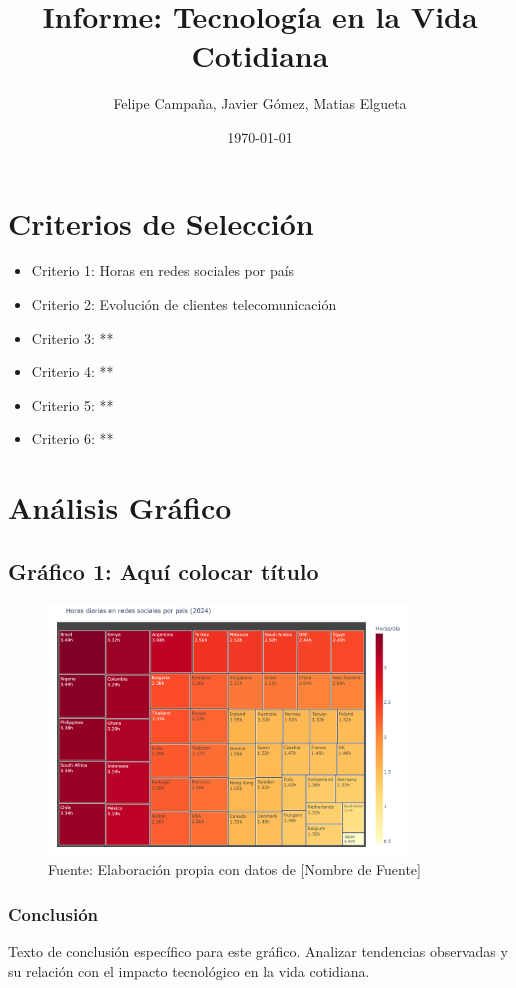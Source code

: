 \documentclass[12pt, a4paper]{article}
\title{Informe: Tecnología en la Vida Cotidiana}
\author{Felipe Campaña, Javier Gómez, Matias Elgueta}
\date{\today}
\begin{document}
\maketitle

\section*{Criterios de Selección}
\begin{itemize}
    \item Criterio 1: Horas en redes sociales por país
    \item Criterio 2: Evolución de clientes telecomunicación
    \item Criterio 3: **
    \item Criterio 4: **
    \item Criterio 5: **
    \item Criterio 6: **
\end{itemize}

\section*{Análisis Gráfico}

\subsection*{Gráfico 1: Aquí colocar título}
\begin{figure}[H]
    \centering
    \includegraphics[width=0.85\textwidth]{images/graph1_JG.png}
    \caption{Fuente: Elaboración propia con datos de [Nombre de Fuente]}
\end{figure}

\subsubsection*{Conclusión}
Texto de conclusión específico para este gráfico. Analizar tendencias observadas y su relación con el impacto tecnológico en la vida cotidiana.
\end{document}
